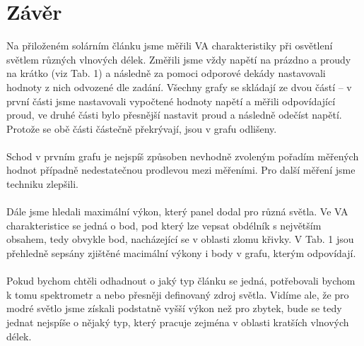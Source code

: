 \documentclass{protokol}
\begin{document}
\section{Závěr}
	Na přiloženém solárním článku jsme měřili VA charakteristiky při osvětlení světlem různých vlnových délek. Změřili jsme vždy napětí na prázdno a proudy na krátko (viz Tab. 1) a následně za pomoci odporové dekády nastavovali hodnoty z nich odvozené dle zadání.
	Všechny grafy se skládají ze dvou částí -- v první části jsme nastavovali vypočtené hodnoty napětí a měřili odpovídající proud, ve druhé části bylo přesnější nastavit proud a následně odečíst napětí. Protože se obě části částečně překrývají, jsou v grafu odlišeny.
	\\\\
	Schod v prvním grafu je nejspíš způsoben nevhodně zvoleným pořadím měřených hodnot případně nedestatečnou prodlevou mezi měřeními. Pro další měření jsme techniku zlepšili.
	\\\\ 
	Dále jsme hledali maximální výkon, který panel dodal pro různá světla. Ve VA charakteristice se jedná o bod, pod který lze vepsat obdélník s největším obsahem, tedy obvykle bod, nacházející se v oblasti zlomu křivky. V Tab. 1 jsou přehledně sepsány zjištěné macimální výkony i body v grafu, kterým odpovídají.
	\\\\
	Pokud bychom chtěli odhadnout o jaký typ článku se jedná, potřebovali bychom k tomu spektrometr a nebo přesněji definovaný zdroj světla. Vidíme ale, že pro modré světlo jsme získali podstatně vyšší výkon než pro zbytek, bude se tedy jednat nejspíše o nějaký typ, který pracuje zejména v oblasti kratších vlnových délek.
\end{document}
